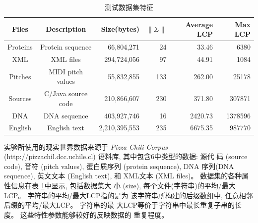 \begin{table}[!htbp]
\caption{测试数据集特征}
\begin{tabular}{|c|c|r|r|r|r|} \hline Files & Description &
  Size(bytes) & $\|\Sigma\|$ & Average LCP & Max LCP \\ \hline
  Proteins & Protein sequence & 66,804,271 & 24 & 33.46 & 6380\\
  XML & XML files & 294,724,056 & 97 & 44.91 & 1084 \\
  Pitches & MIDI pitch values & 55,832,855 & 133 & 262.00 & 25178\\
  Sources & C/Java source code & 210,866,607 & 230 & 371.80 & 307871\\
  DNA & DNA sequence & 403,927,746 & 16 & 2420.73 & 1378596\\
  English & English text & 2,210,395,553 & 235 &6675.35 & 987770\\
  \hline
  \end{tabular}
  \label{tab:data}
\end{table}

实验所使用的现实世界数据来源于 \emph{Pizza Chili Corpus}
(http://pizzachil.dcc.uchile.cl) 语料库, 其中包含6中类型的数据: 源代
码 (source code), 音符 (pitch values), 蛋白质序列 (protein sequence),
DNA 序列(DNA sequence), 英文文本 (English text), 和 XML文本 (XML
files)。 数据集的各种属性信息在表 \ref{tab:data}中显示, 包括数据集大
小 (size), 每个文件(字符串)的平均/最大LCP。 字符串的平均/最大LCP指的是为
该字符串所构建的后缀数组中, 任意相邻后缀的平均/最大LCP。 字符串的最
大LCP等价于字符串中最长重复子串的长度。 这些特性参数能够较好的反映数据的
重复程度。

